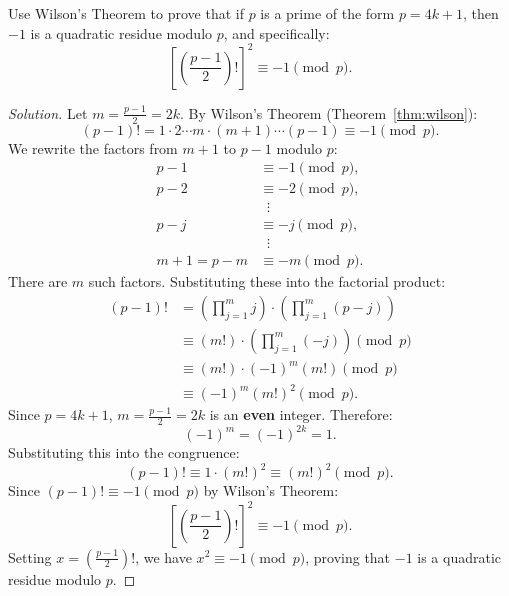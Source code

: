 \begin{problem}
Use Wilson's Theorem to prove that if $p$ is a prime of the form $p = 4k + 1$, then $-1$ is a quadratic residue modulo $p$, and specifically:
\begin{equation}
\left[ \left(\frac{p-1}{2}\right)! \right]^2 \equiv -1 \pmod p.
\end{equation}
\end{problem}

\begin{proof}[Solution]
Let $m = \frac{p-1}{2} = 2k$. By Wilson's Theorem (Theorem~\ref{thm:wilson}):
\begin{equation*}
(p - 1)! = 1 \cdot 2 \cdots m \cdot (m + 1) \cdots (p - 1) \equiv -1 \pmod p.
\end{equation*}
We rewrite the factors from $m + 1$ to $p - 1$ modulo $p$:
\begin{align*}
p - 1 &\equiv -1 \pmod p, \\
p - 2 &\equiv -2 \pmod p, \\
&\;\;\vdots \\
p - j &\equiv -j \pmod p, \\
&\;\;\vdots \\
m + 1 = p - m &\equiv -m \pmod p.
\end{align*}
There are $m$ such factors. Substituting these into the factorial product:
\begin{align*}
(p - 1)! &= \left( \prod_{j=1}^m j \right) \cdot \left( \prod_{j=1}^m (p - j) \right) \\
&\equiv (m!) \cdot \left( \prod_{j=1}^m (-j) \right) \pmod p \\
&\equiv (m!) \cdot (-1)^m (m!) \pmod p \\
&\equiv (-1)^m (m!)^2 \pmod p.
\end{align*}
Since $p = 4k + 1$, $m = \frac{p-1}{2} = 2k$ is an \textbf{even} integer.
Therefore:
\begin{equation*}
(-1)^m = (-1)^{2k} = 1.
\end{equation*}
Substituting this into the congruence:
\begin{equation*}
(p - 1)! \equiv 1 \cdot (m!)^2 \equiv (m!)^2 \pmod p.
\end{equation*}
Since $(p - 1)! \equiv -1 \pmod p$ by Wilson's Theorem:
\begin{equation*}
\left[ \left(\frac{p-1}{2}\right)! \right]^2 \equiv -1 \pmod p.
\end{equation*}
Setting $x = \left(\frac{p-1}{2}\right)!$, we have $x^2 \equiv -1 \pmod p$, proving that $-1$ is a quadratic residue modulo $p$.
\end{proof}
